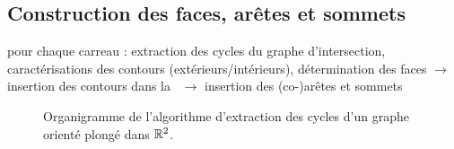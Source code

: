 \subsection{Construction des faces, arêtes et sommets \brep}
pour chaque carreau : extraction des cycles du graphe d'intersection, caractérisations des contours (extérieurs/intérieurs), détermination des faces $\to$ insertion des contours dans la \brep\ $\to$ insertion des (co-)arêtes et sommets
\begin{figure}
	\centering
	
	\caption{Organigramme de l'algorithme d'extraction des cycles d'un graphe orienté plongé dans $\mathbb{R}^2$.}
\end{figure}
